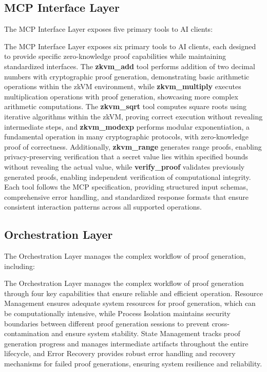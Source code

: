 \documentclass[11pt]{article}
\begin{document}
\subsection{MCP Interface Layer}

The MCP Interface Layer exposes five primary tools to AI clients:

The MCP Interface Layer exposes six primary tools to AI clients, each designed to provide specific zero-knowledge proof capabilities while maintaining standardized interfaces. The \textbf{zkvm\_add} tool performs addition of two decimal numbers with cryptographic proof generation, demonstrating basic arithmetic operations within the zkVM environment, while \textbf{zkvm\_multiply} executes multiplication operations with proof generation, showcasing more complex arithmetic computations. The \textbf{zkvm\_sqrt} tool computes square roots using iterative algorithms within the zkVM, proving correct execution without revealing intermediate steps, and \textbf{zkvm\_modexp} performs modular exponentiation, a fundamental operation in many cryptographic protocols, with zero-knowledge proof of correctness. Additionally, \textbf{zkvm\_range} generates range proofs, enabling privacy-preserving verification that a secret value lies within specified bounds without revealing the actual value, while \textbf{verify\_proof} validates previously generated proofs, enabling independent verification of computational integrity. Each tool follows the MCP specification, providing structured input schemas, comprehensive error handling, and standardized response formats that ensure consistent interaction patterns across all supported operations.

\subsection{Orchestration Layer}

The Orchestration Layer manages the complex workflow of proof generation, including:

The Orchestration Layer manages the complex workflow of proof generation through four key capabilities that ensure reliable and efficient operation. Resource Management ensures adequate system resources for proof generation, which can be computationally intensive, while Process Isolation maintains security boundaries between different proof generation sessions to prevent cross-contamination and ensure system stability. State Management tracks proof generation progress and manages intermediate artifacts throughout the entire lifecycle, and Error Recovery provides robust error handling and recovery mechanisms for failed proof generations, ensuring system resilience and reliability.
\end{document}
